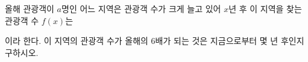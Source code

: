 올해 관광객이 $a$명인 어느 지역은 관광객 수가 크게 늘고 있어 $x$년 후 이 지역을 찾는 관광객 수 $f(x)$는\par\smallskip{}\par\smallskip\noindent 이라 한다. 이 지역의 관광객 수가 올해의 6배가 되는 것은 지금으로부터 몇 년 후인지 구하시오. 
